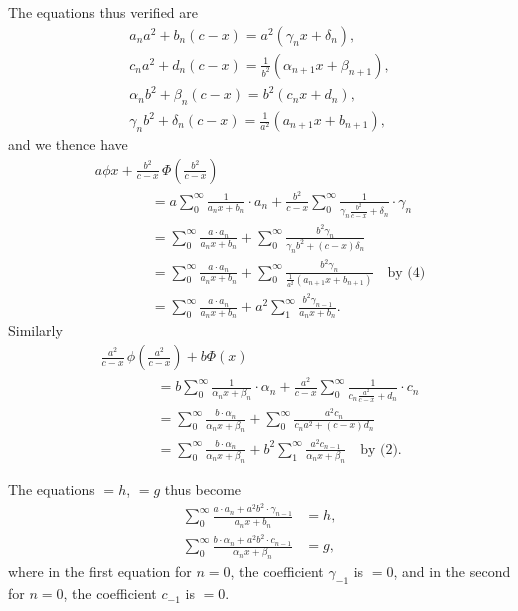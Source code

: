 \documentclass[11pt,a4paper]{book}
\begin{document}
The equations thus verified are
\begin{gather*}
a_n a^2 + b_n(c-x) = a^2(\gamma_n x + \delta_n),\tag{1}\\
c_n a^2 + d_n(c-x) = \frac{1}{b^2}(\alpha_{n+1} x + \beta_{n+1}),\tag{2}\\
\alpha_n b^2 + \beta_n(c-x) = b^2(c_n x + d_n),\tag{3}\\
\gamma_n b^2 + \delta_n(c-x) = \frac{1}{a^2}(a_{n+1} x + b_{n+1}),\tag{4}
\end{gather*}
and we thence have
\begin{gather*}
a\phi x + \frac{b^2}{c-x}\,\Phi\!\left(\frac{b^2}{c-x}\right)\\
\qquad\qquad = a\sum_0^\infty\frac{1}{a_n x+b_n}\cdot a_n
   + \frac{b^2}{c-x}\sum_0^\infty\frac{1}{\gamma_n\frac{b^2}{c-x}+\delta_n}
     \cdot\gamma_n\\
\qquad\qquad = \sum_0^\infty \frac{a\cdot a_n}{a_n x+b_n}
   + \sum_0^\infty\frac{b^2\gamma_n}{\gamma_n b^2 + (c-x)\delta_n}\\
\qquad\qquad = \sum_0^\infty \frac{a\cdot a_n}{a_n x+b_n}
   + \sum_0^\infty\frac{b^2\gamma_n}{\frac{1}{a^2}(a_{n+1}x+b_{n+1})}\quad
   \text{by (4)}\\
\qquad\qquad = \sum_0^\infty \frac{a\cdot a_n}{a_n x+b_n}
   + a^2\sum_1^\infty\frac{b^2\gamma_{n-1}}{a_n x+b_n}.
\end{gather*}
Similarly
\begin{gather*}
\frac{a^2}{c-x}\,\phi\!\left(\frac{a^2}{c-x}\right) + b\Phi(x)\\
\qquad\qquad = b\sum_0^\infty\frac{1}{\alpha_n x+\beta_n}\cdot\alpha_n
   + \frac{a^2}{c-x}\sum_0^\infty\frac{1}{c_n\frac{a^2}{c-x}+d_n}\cdot c_n\\
\qquad\qquad = \sum_0^\infty \frac{b\cdot\alpha_n}{\alpha_n x+\beta_n}
   + \sum_0^\infty\frac{a^2 c_n}{c_n a^2 + (c-x)d_n}\\
\qquad\qquad = \sum_0^\infty \frac{b\cdot\alpha_n}{\alpha_n x+\beta_n}
   + b^2\sum_1^\infty\frac{a^2 c_{n-1}}{\alpha_n x+\beta_n}\quad
   \text{by (2)}.
\end{gather*}

The equations $=h$, $=g$ thus become
\begin{align*}
\sum_0^\infty\frac{a\cdot a_n + a^2b^2\cdot\gamma_{n-1}}{a_n x+b_n} &= h,\\
\sum_0^\infty\frac{b\cdot\alpha_n + a^2b^2\cdot c_{n-1}}{\alpha_n x+\beta_n} &= g,
\end{align*}
where in the first equation for $n=0$, the coefficient $\gamma_{-1}$ is $=0$, and in the second for $n=0$, the coefficient $c_{-1}$ is $=0$.
\end{document}
